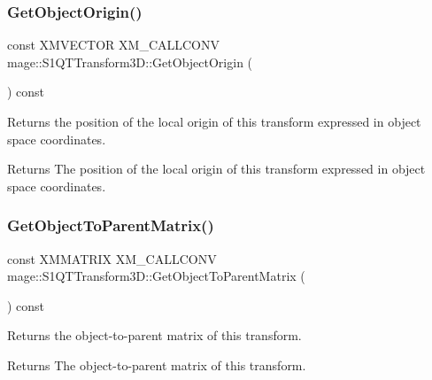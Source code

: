 \subsubsection{\texorpdfstring{Get\+Object\+Origin()}{GetObjectOrigin()}}
{\footnotesize\ttfamily const X\+M\+V\+E\+C\+T\+OR X\+M\+\_\+\+C\+A\+L\+L\+C\+O\+NV mage\+::\+S1\+Q\+T\+Transform3\+D\+::\+Get\+Object\+Origin (\begin{DoxyParamCaption}{ }\end{DoxyParamCaption}) const\hspace{0.3cm}{\ttfamily [noexcept]}}

Returns the position of the local origin of this transform expressed in object space coordinates.

\begin{DoxyReturn}{Returns}
The position of the local origin of this transform expressed in object space coordinates. 
\end{DoxyReturn}
\mbox{\label{classmage_1_1_s1_q_t_transform3_d_a5233527aca55e49e951276ae05d9421c}} 
\subsubsection{\texorpdfstring{Get\+Object\+To\+Parent\+Matrix()}{GetObjectToParentMatrix()}}
{\footnotesize\ttfamily const X\+M\+M\+A\+T\+R\+IX X\+M\+\_\+\+C\+A\+L\+L\+C\+O\+NV mage\+::\+S1\+Q\+T\+Transform3\+D\+::\+Get\+Object\+To\+Parent\+Matrix (\begin{DoxyParamCaption}{ }\end{DoxyParamCaption}) const\hspace{0.3cm}{\ttfamily [noexcept]}}

Returns the object-\/to-\/parent matrix of this transform.

\begin{DoxyReturn}{Returns}
The object-\/to-\/parent matrix of this transform. 
\end{DoxyReturn}
\mbox{\label{classmage_1_1_s1_q_t_transform3_d_a731e4fd8d1f5b353e8ef20e3de276909}} 
